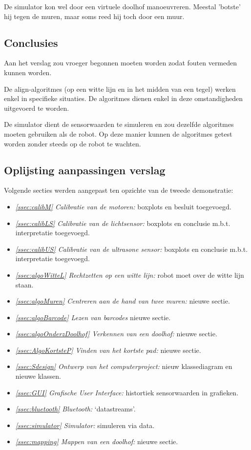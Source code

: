 \documentclass[eind]{penoverslag}
\begin{document}
De simulator kon wel door een virtuele doolhof manoeuvreren. Meestal 'botste' hij tegen de muren, maar soms reed hij toch door een muur.


\subsection{Conclusies} %
\label{Assec:conc2}
Aan het verslag zou vroeger begonnen moeten worden zodat fouten vermeden kunnen worden.

De align-algoritmes (op een witte lijn en in het midden van een tegel) werken enkel in specifieke situaties. De algoritmes dienen enkel in deze omstandigheden uitgevoerd te worden.

De simulator dient de sensorwaarden te simuleren en zou dezelfde algoritmes moeten gebruiken als de robot. Op deze manier kunnen de algoritmes getest worden zonder steeds op de robot te wachten.


\subsection{Oplijsting aanpassingen verslag} %
\label{Assec:aanp2}
Volgende secties werden aangepast ten opzichte van de tweede demonstratie:

\begin{itemize}
\item \textit{\ref{ssec:calibM} Calibratie van de motoren:} boxplots en besluit toegevoegd.
\item \textit{\ref{ssec:calibLS} Calibratie van de lichtsensor:} boxplots en conclusie m.b.t. interpretatie toegevoegd.
\item \textit{\ref{ssec:calibUS} Calibratie van de ultrasone sensor:} boxplots en conclusie m.b.t. interpretatie toegevoegd.
\item \textit{\ref{ssec:algoWitteL} Rechtzetten op een witte lijn:} robot moet over de witte lijn staan.
\item \textit{\ref{ssec:algoMuren} Centreren aan de hand van twee muren:} nieuwe sectie.
\item \textit{\ref{ssec:algoBarcode} Lezen van barcodes} nieuwe sectie.
\item \textit{\ref{ssec:algoOnderzDoolhof} Verkennen van een doolhof:} nieuwe sectie.
\item \textit{\ref{ssec:AlgoKortsteP} Vinden van het kortste pad:} nieuwe sectie.
\item \textit{\ref{ssec:Sdesign} Ontwerp van het computerproject:} nieuw klassediagram en nieuwe klassen.
\item \textit{\ref{ssec:GUI} Grafische User Interface:} histortiek sensorwaarden in grafieken.
\item \textit{\ref{ssec:bluetooth} Bluetooth:} `datastreams'.
\item \textit{\ref{ssec:simulator} Simulator:} simuleren via data.
\item \textit{\ref{ssec:mapping} Mappen van een doolhof:} nieuwe sectie.
\end{itemize}
\end{document}
